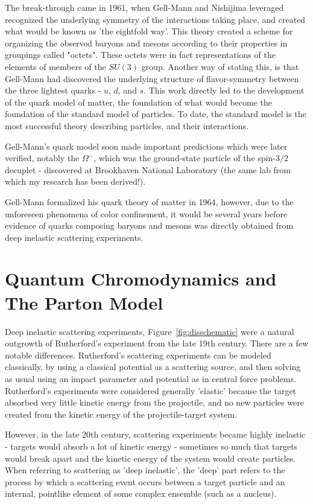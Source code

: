 The break-through came in 1961, when Gell-Mann and Nishijima leveraged
recognized the underlying symmetry of the interactions taking place, and created
what would be known as 'the eightfold way'. This theory created a scheme for
organizing the observed baryons and mesons according to their properties in
groupings called "octets". These octets were in fact representations of the
elements of members of the $SU(3)$ group. Another way of stating this, is that
Gell-Mann had discovered the underlying structure of flavor-symmetry between the
three lightest quarks - $u$, $d$, and $s$. This work directly led to the
development of the quark model of matter, the foundation of what would become
the foundation of the standard model of particles. To date, the standard model
is the most successful theory describing particles, and their interactions.

Gell-Mann's quark model soon made important predictions which were later
verified, notably the $\Omega^{-}$, which was the ground-state particle of the
spin-$3/2$ decuplet - discovered at Brookhaven National Laboratory (the same lab
from which my research has been derived!). 

Gell-Mann formalized his quark theory of matter in 1964, however, due to the
unforeseen phenomena of color confinement, it would be several years before
evidence of quarks composing baryons and mesons was directly obtained from deep
inelastic scattering experiments.

\clearpage
\section{Quantum Chromodynamics and The Parton Model}

Deep inelastic scattering experiments, Figure~\ref{fig:disschematic} were a
natural outgrowth of Rutherford's experiment from the late 19th century. There
are a few notable differences.  Rutherford's scattering experiments can be
modeled classically, by using a classical potential as a scattering source, and
then solving as usual using an impact parameter and potential as in central
force problems. Rutherford's experiments were considered generally 'elastic'
because the target absorbed very little kinetic energy from the projectile, and
no new particles were created from the kinetic energy of the projectile-target
system.

However, in the late 20th century, scattering experiments became highly
inelastic - targets would absorb a lot of kinetic energy - sometimes so much
that targets would break apart and the kinetic energy of the system would create
particles. When referring to scattering as 'deep inelastic', the 'deep' part
refers to the process by which a scattering event occurs between a target
particle and an internal, pointlike element of some complex ensemble (such as a
nucleus).

